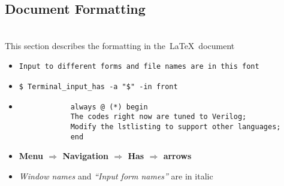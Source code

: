 
\subsection *{Document Formatting}
	\label{subsec:doc_format}
	\hrulefill \\
		This section describes the formatting in the~\LaTeX~document
	\begin{itemize}
		\item \verb+Input to different forms and file names are in this font+ 
		\item \verb+$ Terminal_input_has -a "$" -in front+ 
		\item[] 
			\begin{lstlisting}
			always @ (*) begin
			The codes right now are tuned to Verilog;
			Modify the lstlisting to support other languages;
			end
			\end{lstlisting}
		\item \textbf{Menu $\Rightarrow$ Navigation $\Rightarrow$ Has 
			$\Rightarrow$ arrows}
		\item \textit{Window names} and \textit{``Input form names''} are in italic
	\end{itemize}
	\hrulefill
